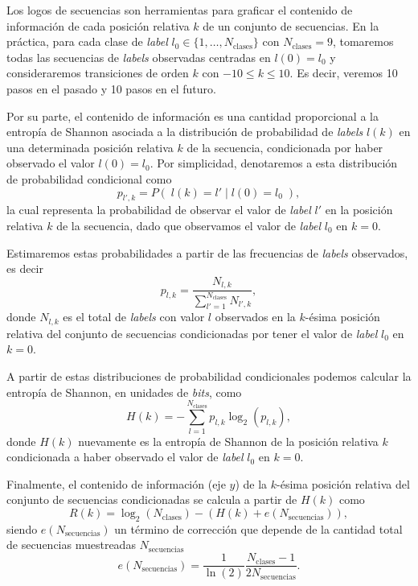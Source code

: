 Los logos de secuencias son herramientas para graficar el contenido de información de cada posición relativa $k$ de un conjunto de secuencias. En la práctica, para cada clase de \textit{label} $l_0 \in \{1, \dots, N_{\mathrm{clases}}\}$ con $N_{\mathrm{clases}} = 9$, tomaremos todas las secuencias de \textit{labels} observadas centradas en $l(0)=l_0$ y consideraremos transiciones de orden $k$ con $-10 \leq k \leq 10$. Es decir, veremos 10 pasos en el pasado y 10 pasos en el futuro.

Por su parte, el contenido de información es una cantidad proporcional a la entropía de Shannon \cite{shannon_communication, schneider_stephens_logo, schneider_information} asociada a la distribución de probabilidad de \textit{labels} $l(k)$ en una determinada posición relativa $k$ de la secuencia, condicionada por haber observado el valor $l(0)=l_0$. Por simplicidad, denotaremos a esta  distribución de probabilidad condicional como
\begin{equation}
    p_{l', k} = P( \; l(k)=l' \; | \; l(0)=l_0 \;),
\end{equation}
la cual representa la probabilidad de observar el valor de \textit{label} $l'$ en la posición relativa $k$ de la secuencia, dado que observamos el valor de \textit{label} $l_0$ en $k=0$.

Estimaremos estas probabilidades a partir de las frecuencias de \textit{labels} observados, es decir
\begin{equation}
    p_{l, k} = \frac{N_{l, k}}{\sum_{l'=1}^{N_{\mathrm{clases}}} N_{l', k}},
\end{equation}
donde $N_{l, k}$ es el total de \textit{labels} con valor $l$ observados en la $k$-ésima posición relativa del conjunto de secuencias condicionadas por tener el valor de \textit{label} $l_0$ en $k=0$.

A partir de estas distribuciones de probabilidad condicionales podemos calcular la entropía de Shannon, en unidades de \textit{bits}, como
\begin{equation}
    H(k) = - \sum_{l=1}^{N_{\mathrm{clases}}} p_{l, k} \log_2(p_{l, k}),
\end{equation}
donde $H(k)$ nuevamente es la entropía de Shannon de la posición relativa $k$ condicionada a haber observado el valor de \textit{label} $l_0$ en $k=0$.

Finalmente, el contenido de información (eje $y$) de la $k$-ésima posición relativa del conjunto de secuencias condicionadas se calcula a partir de $H(k)$ como
\begin{equation}
    R(k) = \log_2(N_{\mathrm{clases}}) - (H(k) + e(N_{\mathrm{secuencias}})),
\end{equation}
siendo $e(N_{\mathrm{secuencias}})$ un término de corrección \cite{schneider_stephens_logo} que depende de la cantidad total de secuencias muestreadas $N_{\mathrm{secuencias}}$
\begin{equation}
    e(N_{\mathrm{secuencias}}) = \frac{1}{\ln(2)} \frac{N_{\mathrm{clases}} - 1}{2 N_{\mathrm{secuencias}}}.
\end{equation}

